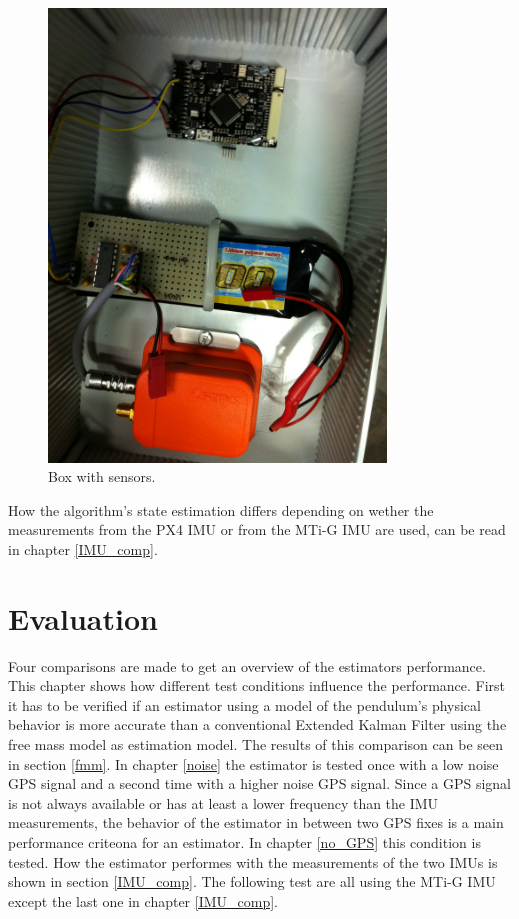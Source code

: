 \begin{figure}[h]
\centering
\includegraphics[width=0.8\textwidth]{vicon_bilder/IMG_0130.JPG}
\caption{Box with sensors.}
\label{box_setup}
\end{figure}
How the algorithm's state estimation differs depending on wether the measurements from the PX4 IMU or from the MTi-G IMU are used, can be read in chapter \ref{IMU_comp}.



\section{Evaluation}\label{evaluation}
Four comparisons are made to get an overview of the estimators performance. This chapter shows how different test conditions influence the performance. First it has to be verified if an estimator using a model of the pendulum's physical behavior is more accurate than a conventional Extended Kalman Filter using the free mass model as estimation model. The results of this comparison can be seen in section \ref{fmm}. In chapter \ref{noise} the estimator is tested once with a low noise GPS signal and a second time with a higher noise GPS signal. Since a GPS signal is not always available or has at least a lower frequency than the IMU measurements, the behavior of the estimator in between two GPS fixes is a main performance criteona for an estimator. In chapter \ref{no_GPS} this condition is tested. How the estimator performes with the measurements of the two IMUs is shown in section \ref{IMU_comp}. The following test are all using the MTi-G IMU except the last one in chapter \ref{IMU_comp}.

